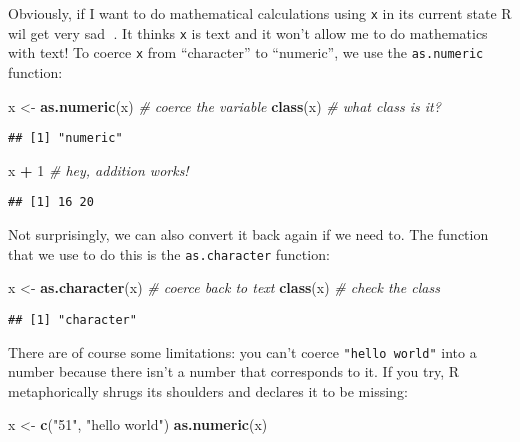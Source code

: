 \documentclass[]{book}
\newenvironment{Shaded}{\begin{snugshade}}{\end{snugshade}}
\newcommand{\CommentTok}[1]{\textcolor[rgb]{0.56,0.35,0.01}{\textit{#1}}}
\newcommand{\DecValTok}[1]{\textcolor[rgb]{0.00,0.00,0.81}{#1}}
\newcommand{\KeywordTok}[1]{\textcolor[rgb]{0.13,0.29,0.53}{\textbf{#1}}}
\newcommand{\NormalTok}[1]{#1}
\newcommand{\OperatorTok}[1]{\textcolor[rgb]{0.81,0.36,0.00}{\textbf{#1}}}
\newcommand{\StringTok}[1]{\textcolor[rgb]{0.31,0.60,0.02}{#1}}
\begin{document}
Obviously, if I want to do mathematical calculations using \texttt{x} in its current state R wil get very sad 🙍. It thinks \texttt{x} is text and it won't allow me to do mathematics with text! To coerce \texttt{x} from ``character'' to ``numeric'', we use the \texttt{as.numeric} function:

\begin{Shaded}
\begin{Highlighting}[]
\NormalTok{x <-}\StringTok{ }\KeywordTok{as.numeric}\NormalTok{(x)  }\CommentTok{# coerce the variable}
\KeywordTok{class}\NormalTok{(x)            }\CommentTok{# what class is it?}
\end{Highlighting}
\end{Shaded}

\begin{verbatim}
## [1] "numeric"
\end{verbatim}

\begin{Shaded}
\begin{Highlighting}[]
\NormalTok{x }\OperatorTok{+}\StringTok{ }\DecValTok{1}               \CommentTok{# hey, addition works!}
\end{Highlighting}
\end{Shaded}

\begin{verbatim}
## [1] 16 20
\end{verbatim}

Not surprisingly, we can also convert it back again if we need to. The function that we use to do this is the \texttt{as.character} function:

\begin{Shaded}
\begin{Highlighting}[]
\NormalTok{x <-}\StringTok{ }\KeywordTok{as.character}\NormalTok{(x)   }\CommentTok{# coerce back to text}
\KeywordTok{class}\NormalTok{(x)               }\CommentTok{# check the class}
\end{Highlighting}
\end{Shaded}

\begin{verbatim}
## [1] "character"
\end{verbatim}

There are of course some limitations: you can't coerce \texttt{"hello\ world"} into a number because there isn't a number that corresponds to it. If you try, R metaphorically shrugs its shoulders and declares it to be missing:

\begin{Shaded}
\begin{Highlighting}[]
\NormalTok{x <-}\StringTok{ }\KeywordTok{c}\NormalTok{(}\StringTok{"51"}\NormalTok{, }\StringTok{"hello world"}\NormalTok{)}
\KeywordTok{as.numeric}\NormalTok{(x)}
\end{Highlighting}
\end{Shaded}
\end{document}
